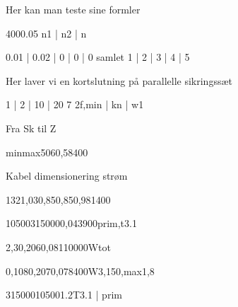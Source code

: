 \documentclass[a4paper,oneside,10pt,danish]{report}
\begin{document}
Her kan man teste sine formler

\begin{faktiskspænding}
	{400}{0.05}{ n1 | n2 | n }
\end{faktiskspænding}

\begin{spændingsfaldsum}
	{ 0.01 | 0.02 | 0 | 0 | 0 }{ samlet }{1 | 2 | 3 | 4 | 5}
\end{spændingsfaldsum}
 
 Her laver vi en kortslutning på parallelle sikringssæt
	\begin{LV-Ik2f,parSikr-kA}
		{ 1 | 2 | 10 | 20 }
		{7}
		{2f,min | kn | w1}
	\end{LV-Ik2f,parSikr-kA} 
 
 
Fra Sk til Z
\begin{FraSkTilZ}{min}{max}{50}{6}{0,58}{400}
\end{FraSkTilZ}

Kabel dimensionering strøm
\begin{Iz,min}{132}{1,03}{0,85}{0,85}{0,98}{1}{400}
\end{Iz,min}

\begin{Ztrafo}{10500}{315000}{0,04}{3900}{prim,t3.1}
\end{Ztrafo}

\begin{Zkabel}{2,3}{0,206}{0,081}{10000}{Wtot}
\end{Zkabel}
\begin{Zkabel-max}{0,108}{0,207}{0,078}{400}{W3,150,max}{1,8}
\end{Zkabel-max}


\begin{TrafoFuldlast}{315000}{10500}{1.2}{T3.1 | prim}
\end{TrafoFuldlast}
\end{document}
